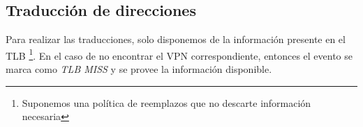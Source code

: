 \documentclass{article}
\begin{document}
\subsection{Traducción de direcciones}
Para realizar las traducciones, solo disponemos de la información presente en el TLB \footnote{Suponemos una política de reemplazos que no descarte información necesaria}. En el caso de no encontrar el VPN correspondiente, entonces el evento se marca como \textit{TLB MISS} y se provee la información disponible.


\begin{figure}[!h]

\begin{tikzpicture}[x=0.75pt,y=0.75pt,yscale=-1,xscale=1]


\end{tikzpicture}
\end{figure}
\end{document}
